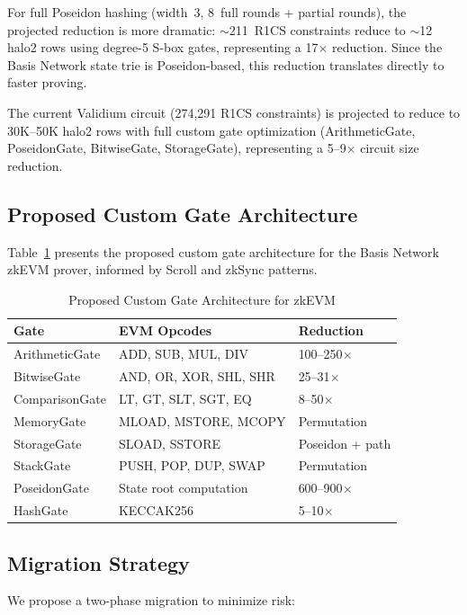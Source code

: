 For full Poseidon hashing (width~3, 8~full rounds + partial
rounds), the projected reduction is more dramatic: $\sim$211~R1CS
constraints reduce to $\sim$12 halo2 rows using degree-5 S-box
gates, representing a 17$\times$ reduction. Since the Basis
Network state trie is Poseidon-based, this reduction translates
directly to faster proving.

The current Validium circuit (274,291 R1CS constraints) is
projected to reduce to 30K--50K halo2 rows with full custom gate
optimization (ArithmeticGate, PoseidonGate, BitwiseGate,
StorageGate), representing a 5--9$\times$ circuit size reduction.

\subsection{Proposed Custom Gate Architecture}

Table~\ref{tab:gate-arch} presents the proposed custom gate
architecture for the Basis Network zkEVM prover, informed by
Scroll and zkSync patterns.

\begin{table}[htbp]
\caption{Proposed Custom Gate Architecture for zkEVM}
\label{tab:gate-arch}
\centering
\begin{tabular}{@{}lll@{}}
\toprule
\textbf{Gate} & \textbf{EVM Opcodes} & \textbf{Reduction} \\
\midrule
ArithmeticGate & ADD, SUB, MUL, DIV & 100--250$\times$ \\
BitwiseGate & AND, OR, XOR, SHL, SHR & 25--31$\times$ \\
ComparisonGate & LT, GT, SLT, SGT, EQ & 8--50$\times$ \\
MemoryGate & MLOAD, MSTORE, MCOPY & Permutation \\
StorageGate & SLOAD, SSTORE & Poseidon + path \\
StackGate & PUSH, POP, DUP, SWAP & Permutation \\
PoseidonGate & State root computation & 600--900$\times$ \\
HashGate & KECCAK256 & 5--10$\times$ \\
\bottomrule
\end{tabular}
\end{table}

\subsection{Migration Strategy}

We propose a two-phase migration to minimize risk:

